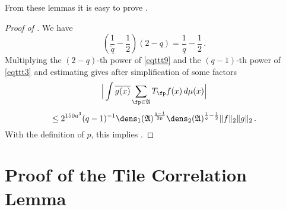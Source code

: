 From these lemmas it is easy to prove .
\begin{proof}[Proof of ]
We have
\begin{equation}
    \left (\frac 1{\tilde{q}} -\frac 12\right) (2-q)= \frac 1q -\frac 12\,.
\end{equation}
Multiplying the $(2-q)$-th power of \eqref{eqttt9} and the $(q-1)$-th power of \eqref{eqttt3}
and estimating gives after simplification of some factors
\begin{equation}\label{eqttt8}
    \Big|\int \overline{g(x)} \sum_{\fp \in \mathfrak{A}} T_{\fp} f(x)\, d\mu(x)\Big|
\end{equation}
 \begin{equation}
    \le 2^{150a^3}({q}-1)^{-1} \dens_1(\mathfrak{A})^{\frac {q-1}{2p}}\dens_2(\mathfrak{A})^{\frac 1{q}-\frac 12} \|f\|_2\|g\|_2\, .
\end{equation}
With the definition of $p$, this implies
.
\end{proof}


\section{Proof of the Tile Correlation Lemma}\label{sec-tile-operator}

